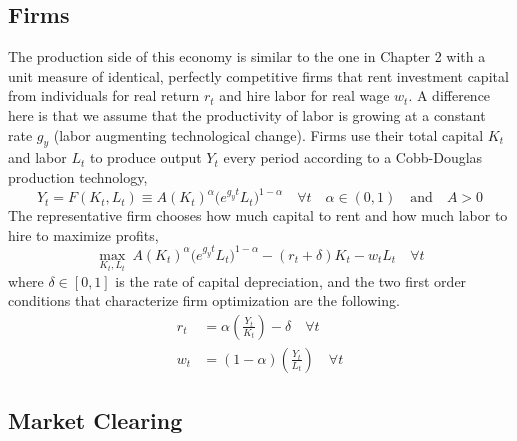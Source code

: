 \documentclass[letterpaper,12pt]{article}
\theoremstyle{definition}
\begin{document}
  \subsection{Firms}\label{SecOGmodelFirms}

    The production side of this economy is similar to the one in Chapter 2 with a unit measure of identical, perfectly competitive firms that rent investment capital from individuals for real return $r_t$ and hire labor for real wage $w_t$. A difference here is that we assume that the productivity of labor is growing at a constant rate $g_y$ (labor augmenting technological change). Firms use their total capital $K_t$ and labor $L_t$ to produce output $Y_t$ every period according to a Cobb-Douglas production technology,
    \begin{equation}\label{EqOGmodelFirmProdFunc}
      Y_t = F(K_t,L_t) \equiv A\left(K_t\right)^\alpha \bigl(e^{g_y t}L_t\bigr)^{1-\alpha}\quad\forall t\quad \alpha\in(0,1) \quad\text{and}\quad A>0
    \end{equation}
    The representative firm chooses how much capital to rent and how much labor to hire to maximize profits,
    \begin{equation}\label{EqOGmodelFirmProfMax}
      \max_{K_t,L_t}\: A\left(K_t\right)^\alpha\bigl(e^{g_y t}L_t\bigr)^{1-\alpha} - (r_t + \delta)K_t - w_t L_t \quad\forall t
    \end{equation}
    where $\delta\in[0,1]$ is the rate of capital depreciation, and the two first order conditions that characterize firm optimization are the following.
    \begin{align}
      r_t &= \alpha \left(\frac{Y_t}{K_t}\right) - \delta \quad\forall t \label{EqOGmodelFirmFOCK} \\
      w_t &= (1-\alpha)\left(\frac{Y_t}{L_t}\right) \quad\forall t \label{EqOGmodelFirmFOCL}
    \end{align}


  \subsection{Market Clearing}\label{SecOGmodelMC}
\end{document}
